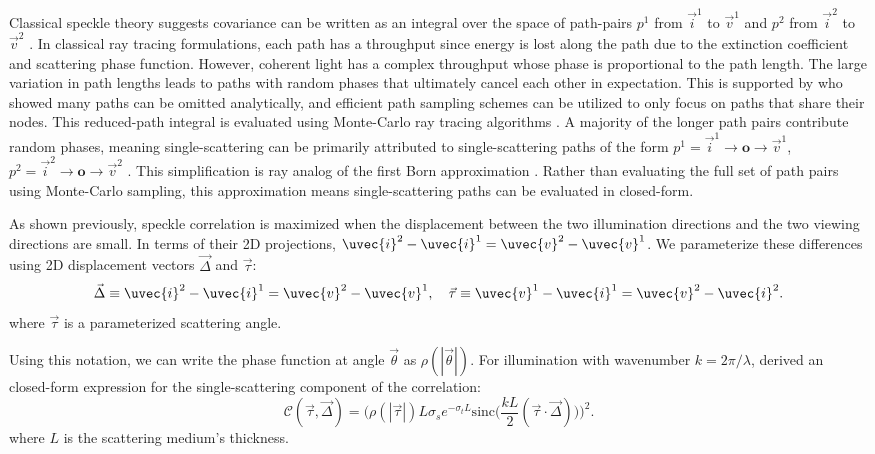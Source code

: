 Classical speckle theory suggests covariance can be written as an integral over the space of path-pairs $p^1$ from $\vec{i}^1$ to $\vec{v}^1$ and $p^2$ from $\vec{i}^2$ to $\vec{v}^2$ \cite{twersky1964propagation}. In classical ray tracing formulations, each path has a throughput since energy is lost along the path due to the extinction coefficient and scattering phase function. However, coherent light has a complex throughput whose phase is proportional to the path length. The large variation in path lengths leads to paths with random phases that ultimately cancel each other in expectation. This is supported by \cite{bar2019monte} who showed many paths can be omitted analytically, and efficient path sampling schemes can be utilized to only focus on paths that share their nodes. This reduced-path integral is evaluated using Monte-Carlo ray tracing algorithms \cite{novak2018monte, dutre2018advanced}.
A majority of the longer path pairs contribute random phases, meaning single-scattering can be primarily attributed to single-scattering paths of the form $p^1 = \vec{i}^1 \rightarrow \mathbf{o} \rightarrow \vec{v}^1$, $p^2 = \vec{i}^2 \rightarrow \mathbf{o} \rightarrow \vec{v}^2$ \cite{bar2021single}. This simplification is ray analog of the first Born approximation \cite{newton2002three}. Rather than evaluating the full set of path pairs using Monte-Carlo sampling, this approximation means single-scattering paths can be evaluated in closed-form.

As shown previously, speckle correlation is maximized when the displacement between the two illumination directions and the two viewing directions are small. In terms of their 2D projections, $\uvec{i}^2 - \uvec{i}^1 = \uvec{v}^2 - \uvec{v}^1$. We parameterize these differences using 2D displacement vectors $\vec{\Delta}$ and $\vec{\tau}$:
%
\begin{equation}
    \vec{\Delta} \equiv \uvec{i}^2 - \uvec{i}^1 = \uvec{v}^2 - \uvec{v}^1, \quad \vec{\tau} \equiv \uvec{v}^1 - \uvec{i}^1 = \uvec{v}^2 - \uvec{i}^2.
\end{equation}
%
where $\vec{\tau}$ is a parameterized scattering angle.

Using this notation, we can write the phase function at angle $\vec{\theta}$ as $\rho(|\vec{\theta}|)$. For illumination with wavenumber $k=2\pi / \lambda$, \cite{bar2021single} derived an closed-form expression for the single-scattering component of the correlation:
%
\begin{equation}
    \mathcal{C}(\vec{\tau}, \vec{\Delta}) = \bigg(\rho(|\vec{\tau}|) L \sigma_s e^{-\sigma_t L} \text{sinc}\bigg(\frac{kL}{2} (\vec{\tau} \cdot \vec{\Delta})\bigg)\bigg)^2.
    \label{eqn:closed-form_correlation}
\end{equation}
where $L$ is the scattering medium's thickness.